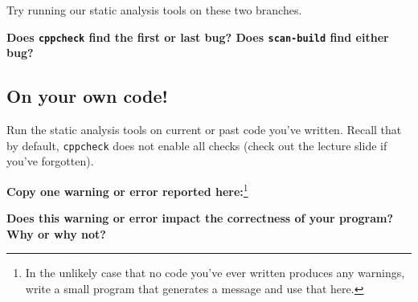 \documentclass{article}
\begin{document}
Try running our static analysis tools on these two branches.

\textbf{%
  Does \texttt{cppcheck} find the first or last bug?
  Does \texttt{scan-build} find either bug?
}

\vspace{4em}


\subsection{On your own code!}

Run the static analysis tools on current or past code you've written. Recall
that by default, \texttt{cppcheck} does not enable all checks (check out the
lecture slide if you've forgotten).

\textbf{Copy one warning or error reported here:}\footnote{%
  In the unlikely case that no code you've ever written produces any warnings,
  write a small program that generates a message and use that here.
}
\vspace{4cm}

\textbf{Does this warning or error impact the correctness of your program? Why
  or why not?}
\vspace{3em}
\end{document}
